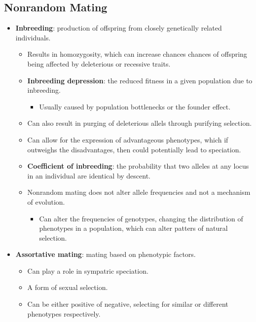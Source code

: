 \documentclass[12pt,a4paper]{article}
\begin{document}
\subsection{Nonrandom Mating}
\begin{itemize}
    \item \textbf{Inbreeding}: production of offspring from closely genetically related individuals.
        \begin{itemize}
            \item Results in homozygosity, which can increase chances chances of offspring being affected by deleterious or recessive traits.
            \item \textbf{Inbreeding depression}: the reduced fitness in a given population due to inbreeding.
                \begin{itemize}
                    \item Usually caused by population bottlenecks or the founder effect.
                \end{itemize}
            \item Can also result in purging of deleterious allels through purifying selection.
            \item Can allow for the expression of advantageous phenotypes, which if outweighs the disadvantages, then could potentially lead to speciation.
    \item \textbf{Coefficient of inbreeding}: the probability that two alleles at any locus in an individual are identical by descent.
    \item Nonrandom mating does not alter allele frequencies and not a mechanism of evolution.
        \begin{itemize}
            \item Can alter the frequencies of genotypes, changing the distribution of phenotypes in a population, which can alter patters of natural selection.
        \end{itemize}
    \end{itemize}
    \item \textbf{Assortative mating}: mating based on phenotypic factors.
        \begin{itemize}
            \item Can play a role in sympatric speciation.
            \item A form of sexual selection.
            \item Can be either positive of negative, selecting for similar or different phenotypes respectively.
        \end{itemize}
\end{itemize}
\end{document}
